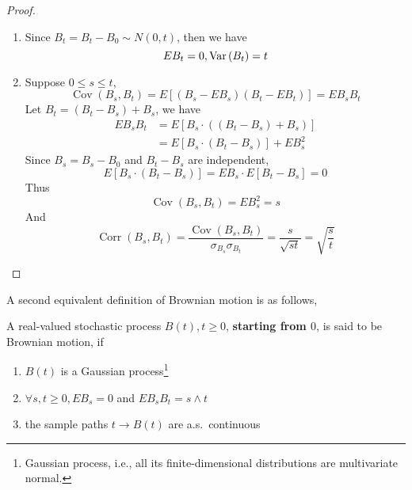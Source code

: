 \begin{proof}
	\begin{enumerate}
		\item Since \(B_{t}=B_{t}-B_{0}\sim N(0, t)\), then we have
		      \begin{equation*}
			      EB_{t}=0,\mathrm{Var}\left(B_{t}\right)=t
		      \end{equation*}
		\item Suppose \(0\leq s\leq t\),
		      \begin{equation*}
			      \operatorname{Cov}\left(B_{s}, B_{t}\right)=E\left[\left(B_{s}-EB_{s}\right)\left(B_{t}-EB_{t}\right)\right]=EB_{s}B_{t}
		      \end{equation*}
		      Let \(B_{t}=\left(B_{t}-B_{s}\right)+B_{s}\), we have
		      \begin{equation*}
			      \begin{aligned}
				      EB_{s}B_{t} & =E\left[B_{s}\cdot\left(\left(B_{t}-B_{s}\right)+B_{s}\right)\right] \\
				                  & =E\left[B_{s}\cdot\left(B_{t}-B_{s}\right)\right]+EB_{s}^{2}
			      \end{aligned}
		      \end{equation*}
		      Since \(B_{s}=B_{s}-B_{0}\) and \(B_{t}-B_{s}\) are independent,
		      \begin{equation*}
			      E\left[B_{s} \cdot\left(B_{t}-B_{s}\right)\right]=EB_{s} \cdot E\left[B_{t}-B_{s}\right]=0
		      \end{equation*}
		      Thus
		      \begin{equation*}
			      \operatorname{Cov}\left(B_{s}, B_{t}\right)=EB_{s}^{2}=s
		      \end{equation*}
		      And
		      \begin{equation*}
			      \operatorname{Corr}\left(B_{s},B_{t}\right)=\frac{\operatorname{Cov}\left(B_{s},B_{t}\right)}{\sigma_{B_{s}}\sigma_{B_{t}}}=\frac{s}{\sqrt{st}}=\sqrt{\frac{s}{t}}
		      \end{equation*}
	\end{enumerate}
\end{proof}

A second equivalent definition of Brownian motion is as follows,

\begin{definition}
	A real-valued stochastic process \(B(t),t\geq 0\), \textbf{starting from \(0\)}, is said to be Brownian motion, if
	\begin{enumerate}
		\item \(B(t)\) is a Gaussian process\footnote{Gaussian process, i.e., all its finite-dimensional distributions are multivariate normal.}
		\item \(\forall s,t\geq 0,EB_{s}=0\) and \(EB_{s}B_{t}=s\wedge t\)
		\item the sample paths \(t\rightarrow B(t)\) are a.s.\ continuous
	\end{enumerate}
\end{definition}

